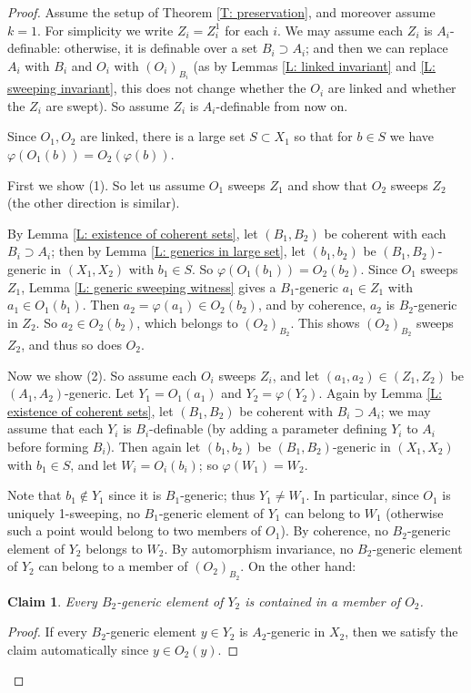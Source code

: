 \documentclass{amsart}
\newtheorem{claim}[theorem]{Claim}
\theoremstyle{definition}
\begin{document}
\begin{proof}
    Assume the setup of Theorem \ref{T: preservation}, and moreover assume $k=1$. For simplicity we write $Z_i=Z_i^1$ for each $i$. We may assume each $Z_i$ is $A_i$-definable: otherwise, it is definable over a set $B_i\supset A_i$; and then we can replace $A_i$ with $B_i$ and $O_i$ with $(O_i)_{B_i}$ (as by Lemmas \ref{L: linked invariant} and \ref{L: sweeping invariant}, this does not change whether the $O_i$ are linked and whether the $Z_i$ are swept). So assume $Z_i$ is $A_i$-definable from now on.

    Since $O_1,O_2$ are linked, there is a large set $S\subset X_1$ so that for $b\in S$ we have $\varphi(O_1(b))=O_2(\varphi(b))$.
    
    First we show (1). So let us assume $O_1$ sweeps $Z_1$ and show that $O_2$ sweeps $Z_2$ (the other direction is similar).

     By Lemma \ref{L: existence of coherent sets}, let $(B_1,B_2)$ be coherent with each $B_i\supset A_i$; then by Lemma \ref{L: generics in large set}, let $(b_1,b_2)$ be $(B_1,B_2)$-generic in $(X_1,X_2)$ with $b_1\in S$. So $\varphi(O_1(b_1))=O_2(b_2)$. Since $O_1$ sweeps $Z_1$, Lemma \ref{L: generic sweeping witness} gives a $B_1$-generic $a_1\in Z_1$ with $a_1\in O_1(b_1)$. Then $a_2=\varphi(a_1)\in O_2(b_2)$, and by coherence, $a_2$ is $B_2$-generic in $Z_2$. So $a_2\in O_2(b_2)$, which belongs to $(O_2)_{B_2}$. This shows $(O_2)_{B_2}$ sweeps $Z_2$, and thus so does $O_2$.

    Now we show (2). So assume each $O_i$ sweeps $Z_i$, and let $(a_1,a_2)\in(Z_1,Z_2)$ be $(A_1,A_2)$-generic. Let $Y_1=O_1(a_1)$ and $Y_2=\varphi(Y_2)$. Again by Lemma \ref{L: existence of coherent sets}, let $(B_1,B_2)$ be coherent with $B_i\supset A_i$; we may assume that each $Y_i$ is $B_i$-definable (by adding a parameter defining $Y_i$ to $A_i$ before forming $B_i$). Then again let $(b_1,b_2)$ be $(B_1,B_2)$-generic in $(X_1,X_2)$ with $b_1\in S$, and let $W_i=O_i(b_i)$; so $\varphi(W_1)=W_2$.

    Note that $b_1\notin Y_1$ since it is $B_1$-generic; thus $Y_1\neq W_1$. In particular, since $O_1$ is uniquely 1-sweeping, no $B_1$-generic element of $Y_1$ can belong to $W_1$ (otherwise such a point would belong to two members of $O_1$). By coherence, no $B_2$-generic element of $Y_2$ belongs to $W_2$. By automorphism invariance, no $B_2$-generic element of $Y_2$ can belong to a member of $(O_2)_{B_2}$. On the other hand:

        \begin{claim} Every $B_2$-generic element of $Y_2$ is contained in a member of $O_2$.
    \end{claim}
    \begin{proof}
        If every $B_2$-generic element $y\in Y_2$ is $A_2$-generic in $X_2$, then we satisfy the claim automatically since $y\in O_2(y)$.
        

\end{proof}
\end{proof}
\end{document}

